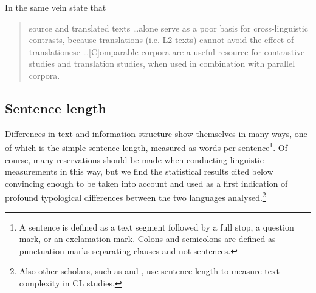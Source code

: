 \documentclass[output=paper]{LSP/langsci}
\begin{document}
In the same vein \citet[49]{McEnery2006} state that

\begin{quote}
source and translated texts \ldots alone serve as a poor basis for cross-linguistic contrasts, because translations (i.e. L2 texts) cannot avoid the effect of translationese \ldots  [C]omparable corpora are a useful resource for contrastive studies and translation studies, when used in combination with parallel corpora.
\end{quote}

\newpage 
\subsection{Sentence length}\label{sec:korzen:3.2}

Differences in text and information structure show themselves in many ways, one of which is the simple sentence length, measured as words per sentence\footnote{A sentence is defined as a text segment followed by a full stop, a question mark, or an exclamation mark. Colons and semicolons are defined as punctuation marks separating clauses and not sentences.}. Of course, many reservations should be made when conducting linguistic measurements in this way, but we find the statistical results cited below convincing enough to be taken into account and used as a first indication of profound typological differences between the two languages analysed.\footnote{Also other scholars, such as \citet{Fabricius-Hansen1998} and \citet{Teich2003}, use sentence length to measure text complexity in CL studies.} 


\begin{table}
\caption{Sentence length in L1 and L2 Europarl texts.}
\label{tab:korzen:2}
\end{table}
\end{document}
